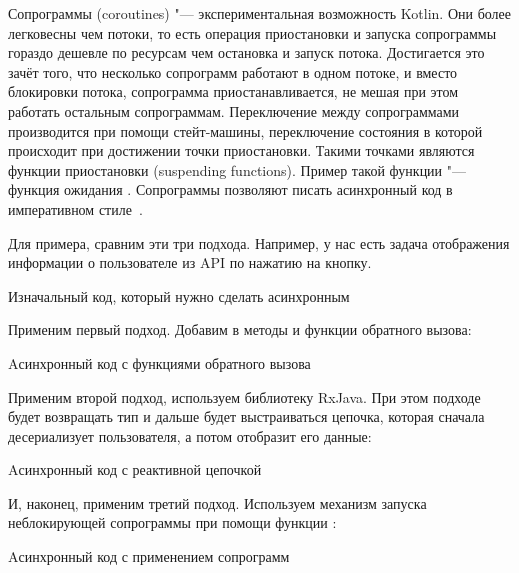 
Сопрограммы (coroutines) "--- экспериментальная возможность Kotlin.
Они более легковесны чем потоки, то есть операция приостановки и запуска сопрограммы гораздо дешевле по ресурсам чем остановка и запуск потока.
Достигается это зачёт того, что несколько сопрограмм работают в одном потоке, и вместо блокировки потока, сопрограмма приостанавливается, не мешая при этом работать остальным сопрограммам.
Переключение между сопрограммами производится при помощи стейт-машины, переключение состояния в которой происходит при достижении точки приостановки.
Такими точками являются функции приостановки (suspending functions).
Пример такой функции "--- функция ожидания .
Сопрограммы позволяют писать асинхронный код в императивном стиле~\cite{github:coroutines}.

Для примера, сравним эти три подхода.
Например, у нас есть задача отображения информации о пользователе из API по нажатию на кнопку.

\begin{listing}[H]
  \caption{Изначальный код, который нужно сделать асинхронным}
  \label{lst:asyncKtSrc}
\end{listing}

Применим первый подход.
Добавим в методы  и  функции обратного вызова:

\begin{listing}[H]
  \caption{Aсинхронный код с функциями обратного вызова}
  \label{lst:asyncKtCallbacks}
\end{listing}

Применим второй подход, используем библиотеку RxJava.
При этом подходе  будет возвращать тип  и дальше будет выстраиваться цепочка, которая сначала десериализует пользователя, а потом отобразит его данные:

\begin{listing}[H]
  \caption{Aсинхронный код с реактивной цепочкой}
  \label{lst:asyncKtRx}
\end{listing}

И, наконец, применим третий подход.
Используем механизм запуска неблокирующей сопрограммы при помощи функции :

\begin{listing}[H]
  \caption{Aсинхронный код с применением сопрограмм}
  \label{lst:asyncKtCoroutines}
\end{listing}

